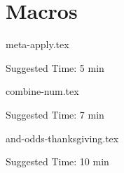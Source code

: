 \documentclass{exam}
\begin{document}
\section{Macros}
\begin{questions}

    {meta-apply.tex}
    \begin{questionmeta}
        Suggested Time: 5 min
    \end{questionmeta}

    {combine-num.tex}
    \begin{questionmeta}
        Suggested Time: 7 min
    \end{questionmeta}

    \newpage
    {and-odds-thanksgiving.tex}
    \begin{questionmeta}
        Suggested Time: 10 min
    \end{questionmeta}

\end{questions}
\end{document}
